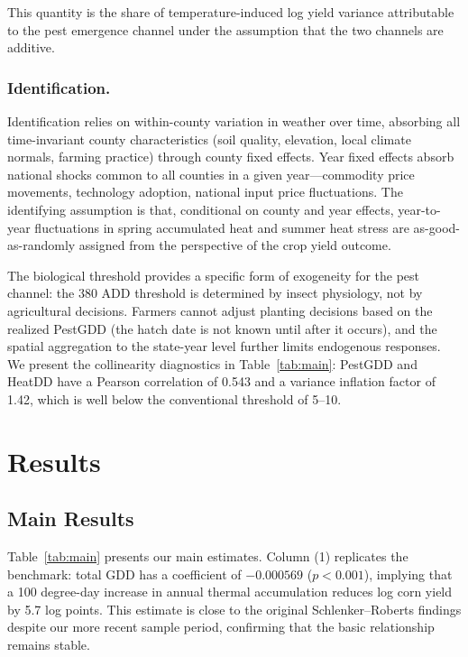 \documentclass[12pt]{article}
\begin{document}
This quantity is the share of temperature-induced log yield variance attributable to the pest emergence channel under the assumption that the two channels are additive.

\subsubsection*{Identification.}
Identification relies on within-county variation in weather over time, absorbing all time-invariant county characteristics (soil quality, elevation, local climate normals, farming practice) through county fixed effects. Year fixed effects absorb national shocks common to all counties in a given year---commodity price movements, technology adoption, national input price fluctuations. The identifying assumption is that, conditional on county and year effects, year-to-year fluctuations in spring accumulated heat and summer heat stress are as-good-as-randomly assigned from the perspective of the crop yield outcome.

The biological threshold provides a specific form of exogeneity for the pest channel: the 380 ADD threshold is determined by insect physiology, not by agricultural decisions. Farmers cannot adjust planting decisions based on the realized PestGDD (the hatch date is not known until after it occurs), and the spatial aggregation to the state-year level further limits endogenous responses. We present the collinearity diagnostics in Table~\ref{tab:main}: PestGDD and HeatDD have a Pearson correlation of 0.543 and a variance inflation factor of 1.42, which is well below the conventional threshold of 5--10.


\section{Results}

\subsection{Main Results}

Table~\ref{tab:main} presents our main estimates. Column (1) replicates the \citet{schlenker2009nonlinear} benchmark: total GDD has a coefficient of $-0.000569$ ($p < 0.001$), implying that a 100 degree-day increase in annual thermal accumulation reduces log corn yield by 5.7 log points. This estimate is close to the original Schlenker--Roberts findings despite our more recent sample period, confirming that the basic relationship remains stable.
\end{document}
